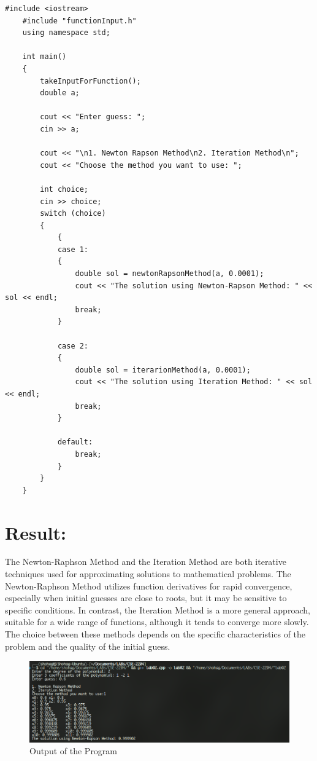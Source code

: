 \documentclass[a4paper,12pt]{report}
\begin{document}
\begin{lstlisting}[style=cppstyle, caption={Main Program}, label={lst:cppcode}, basicstyle=\fontsize{10}{11}\selectfont\ttfamily]
    #include <iostream>
    #include "functionInput.h"
    using namespace std;
    
    int main()
    {
        takeInputForFunction();
        double a;
    
        cout << "Enter guess: ";
        cin >> a;
    
        cout << "\n1. Newton Rapson Method\n2. Iteration Method\n";
        cout << "Choose the method you want to use: ";
    
        int choice;
        cin >> choice;
        switch (choice)
        {
            {
            case 1:
            {
                double sol = newtonRapsonMethod(a, 0.0001);
                cout << "The solution using Newton-Rapson Method: " << sol << endl;
                break;
            }
    
            case 2:
            {
                double sol = iterarionMethod(a, 0.0001);
                cout << "The solution using Iteration Method: " << sol << endl;
                break;
            }
    
            default:
                break;
            }
        }
    }
\end{lstlisting}

\section*{Result:}
\qquad The Newton-Raphson Method and the Iteration Method are both iterative techniques used for approximating solutions to mathematical problems. The Newton-Raphson Method utilizes function derivatives for rapid convergence, especially when initial guesses are close to roots, but it may be sensitive to specific conditions. In contrast, the Iteration Method is a more general approach, suitable for a wide range of functions, although it tends to converge more slowly. The choice between these methods depends on the specific characteristics of the problem and the quality of the initial guess.

\begin{figure}[H]
    \centering
    \includegraphics[width=\textwidth]{result.png}
    \caption{Output of the Program}
    \label{fig:result}
\end{figure}
\end{document}
